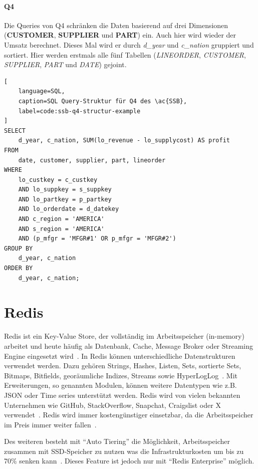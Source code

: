 \paragraph{Q4}
Die Queries von Q4 schränken die Daten basierend auf drei Dimensionen (\textbf{CUSTOMER}, \textbf{SUPPLIER} und \textbf{PART}) ein.
Auch hier wird wieder der Umsatz berechnet.
Dieses Mal wird er durch \emph{d\_year} und \emph{c\_nation} gruppiert und sortiert.
Hier werden erstmals alle fünf Tabellen (\emph{LINEORDER}, \emph{CUSTOMER}, \emph{SUPPLIER}, \emph{PART} und \emph{DATE}) gejoint.
\begin{lstlisting}[
    language=SQL,
    caption=SQL Query-Struktur für Q4 des \ac{SSB},
    label=code:ssb-q4-structur-example
]
SELECT 
    d_year, c_nation, SUM(lo_revenue - lo_supplycost) AS profit
FROM 
    date, customer, supplier, part, lineorder
WHERE 
    lo_custkey = c_custkey
    AND lo_suppkey = s_suppkey
    AND lo_partkey = p_partkey
    AND lo_orderdate = d_datekey
    AND c_region = 'AMERICA'
    AND s_region = 'AMERICA'
    AND (p_mfgr = 'MFGR#1' OR p_mfgr = 'MFGR#2')
GROUP BY 
    d_year, c_nation
ORDER BY 
    d_year, c_nation;

\end{lstlisting}
\section{Redis}

Redis ist ein Key-Value Store, der vollständig im Arbeitsspeicher (in-memory) arbeitet und heute häufig als Datenbank, Cache, Message Broker oder Streaming Engine eingesetzt wird~\cite{redis_ltd_introduction_nodate}.
In Redis können unterschiedliche Datenstrukturen verwendet werden. Dazu gehören Strings, Hashes, Listen, Sets, sortierte Sets, Bitmaps, Bitfields, georäumliche Indizes, Streams sowie HyperLogLog~\cite{redis_ltd_data_nodate}.
Mit Erweiterungen, so genannten Modulen, können weitere Datentypen wie z.B. JSON oder Time series unterstützt werden.
Redis wird von vielen bekannten Unternehmen wie GitHub, StackOverflow, Snapchat, Craigslist oder X verwendet~\cite{redis_ltd_whos_nodate}.
Redis wird immer kostengünstiger einsetzbar, da die Arbeitsspeicher im Preis immer weiter fallen~\cite{bergai_trends_2020}.

Des weiteren besteht mit \enquote{Auto Tiering} die Möglichkeit, Arbeitsspeicher zusammen mit SSD-Speicher zu nutzen was die Infrastrukturkosten um bis zu 70\% senken kann~\cite{redis_ltd_auto_nodate}. Dieses Feature ist jedoch nur mit \enquote{Redis Enterprise} möglich.


